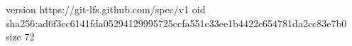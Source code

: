 version https://git-lfs.github.com/spec/v1
oid sha256:ad6f3cc6141fda05294129995725ccfa551c33ee1b4422c654781da2cc83e7b0
size 72
